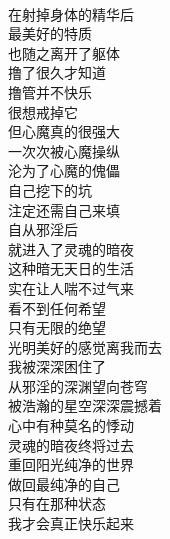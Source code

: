 \begin{poem}[灵魂的暗夜]
    \begin{multicols}{2}
        \centering~\\
        在射掉身体的精华后 \\ 最美好的特质 \\ 也随之离开了躯体 \\ 撸了很久才知道 \\ 撸管并不快乐 \\ 很想戒掉它 \\ 但心魔真的很强大 \\ 一次次被心魔操纵 \\ 沦为了心魔的傀儡 \\ 自己挖下的坑 \\ 注定还需自己来填 \\ 自从邪淫后 \\ 就进入了灵魂的暗夜 \\ 这种暗无天日的生活 \\ 实在让人喘不过气来 \\ 看不到任何希望 \\ 只有无限的绝望 \\ 光明美好的感觉离我而去 \\ 我被深深困住了 \\ 从邪淫的深渊望向苍穹 \\ 被浩瀚的星空深深震撼着 \\ 心中有种莫名的悸动 \\ 灵魂的暗夜终将过去 \\ 重回阳光纯净的世界 \\ 做回最纯净的自己 \\ 只有在那种状态 \\ 我才会真正快乐起来
    \end{multicols}
\end{poem}

